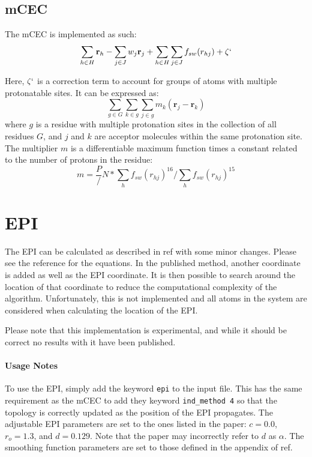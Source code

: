 \documentclass{article}
\begin{document}
\subsection{mCEC}
The mCEC is implemented as such:
\begin{equation}
\sum_{h \in H} \mathbf{r}_h - \sum_{j \in J} w_j \mathbf{r}_j + \sum_{h \in H} \sum_{j \in J} f_{sw}(r_{hj}) + \zeta`
\end{equation}

Here, $\zeta`$ is a correction term to account for groups of atoms with multiple protonatable sites. It can be expressed as:
\begin{equation}
\sum_{g \in G} \sum_{k\in g}\sum_{j \in g}m_k (\mathbf{r}_j - \mathbf{r}_k)
\end{equation}
where $g$ is a residue with multiple protonation sites in the collection of all residues $G$, and $j$ and $k$ are acceptor molecules within the same protonation site. 
The multiplier $m$ is a differentiable maximum function times a constant related to the number of protons in the residue:
\begin{equation}
m = \frac{P}/{N} * \sum_h f_{sw}(r_{hj})^{16} / \sum_h f_{sw}(r_{hj})^{15}
\end{equation}




\section{EPI}
The EPI can be calculated as described in ref\cite{Watanabe2020} with some minor changes.
Please see the reference for the equations. In the published method, another coordinate is added as well as the EPI coordinate.
It is then possible to search around the location of that coordinate to reduce the computational complexity of the algorithm.
Unfortunately, this is not implemented and all atoms in the system are considered when calculating the location of the EPI.

Please note that this implementation is experimental, and while it should be correct no results with it have been published.

\paragraph{Usage Notes}
To use the EPI, simply add the keyword \texttt{epi} to the input file.
This has the same requirement as the mCEC to add they keyword \texttt{ind\_method 4} so that the topology is correctly updated as the position of the EPI propagates.
The adjustable EPI parameters are set to the ones listed in the paper: $c = 0.0$, $r_o = 1.3$, and $d = 0.129$.
Note that the paper may incorrectly refer to $d$ as $\alpha$.
The smoothing function parameters are set to those defined in the appendix of ref\cite{Watanabe2020}.
\end{document}

